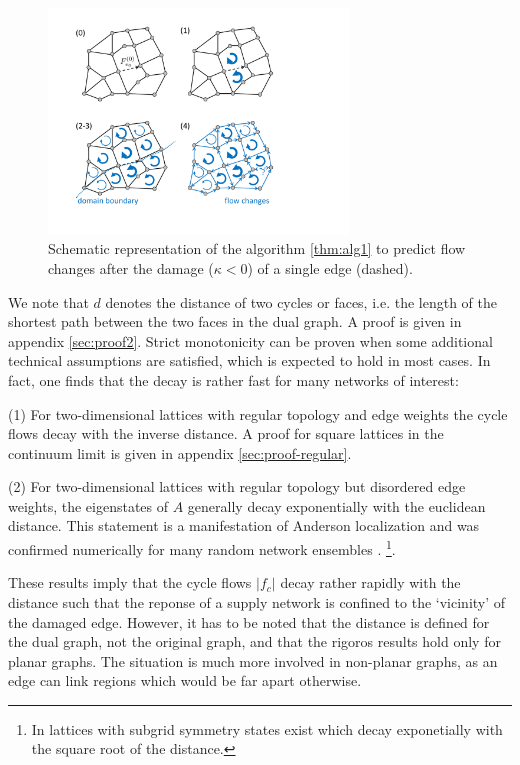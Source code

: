 \documentclass[10pt,aps,pra,twocolumn,superscriptaddress]{revtex4-1}
\begin{document}
\begin{figure}[tb]
\includegraphics[trim=2cm 2cm 7cm 3cm, width=8cm]{pics/scheme1.pdf}
\caption{
\label{fig:scheme}
Schematic representation of the algorithm \ref{thm:alg1} to predict
flow changes after the damage ($\kappa < 0$) of a single edge (dashed).
}
\end{figure}

We note that $d$ denotes the distance of two cycles or faces, i.e. the length of the shortest 
path between the two faces in the dual graph. A proof is given in appendix \ref{sec:proof2}. 
Strict monotonicity can be proven when some additional technical assumptions are satisfied, 
which is expected to hold in most cases. In fact, one finds that the decay is rather fast for 
many networks of interest:

(1) For two-dimensional lattices with regular topology and edge weights the cycle flows decay with the inverse distance. A proof for square lattices in the continuum limit is given in appendix \ref{sec:proof-regular}.

(2) For two-dimensional lattices with regular topology but disordered edge weights, the eigenstates of $A$ generally decay exponentially with the euclidean distance. This statement is a manifestation of Anderson localization and was confirmed numerically for many random network ensembles \cite{Kram05,Huan09,Kett12,Laba14}.
\footnote{In lattices with subgrid symmetry states exist which decay exponetially with the square root of the distance.}.  
  
These results imply that the cycle flows $|f_c|$ decay rather rapidly with the distance such that the reponse of a supply network is confined to the `vicinity' of the damaged edge. However, it has to be noted that the distance is defined  for the dual graph, not the original graph, and that the rigoros results hold only for planar graphs. The situation is much more involved in non-planar graphs, as an edge can link regions which would be far apart otherwise.
\end{document}
